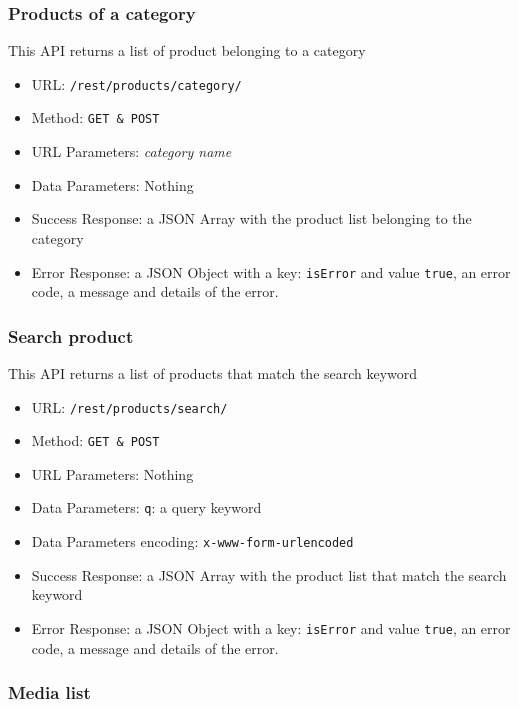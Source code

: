 \subsubsection*{Products of a category}

This API returns a list of product belonging to a category

\begin{itemize}
    \item URL: \texttt{/rest/products/category/}
    \item Method: \texttt{GET \& POST}
    \item URL Parameters: \textit{category name}
    \item Data Parameters: Nothing
    \item Success Response: a JSON Array with the product list  belonging to the category
    \item Error Response: a JSON Object with a key: \texttt{isError}  and value \texttt{true}, an error code, a message and details of the error.
\end{itemize}

\subsubsection*{Search product}

This API returns a list of products that match the search keyword

\begin{itemize}
    \item URL: \texttt{/rest/products/search/}
    \item Method: \texttt{GET \& POST}
    \item URL Parameters: Nothing
    \item Data Parameters: \texttt{q}: a query keyword
    \item Data Parameters encoding: \texttt{x-www-form-urlencoded}
    \item Success Response: a JSON Array with the product list  that match the search keyword
    \item Error Response: a JSON Object with a key: \texttt{isError}  and value \texttt{true}, an error code, a message and details of the error.
\end{itemize}

\subsubsection*{Media list}

